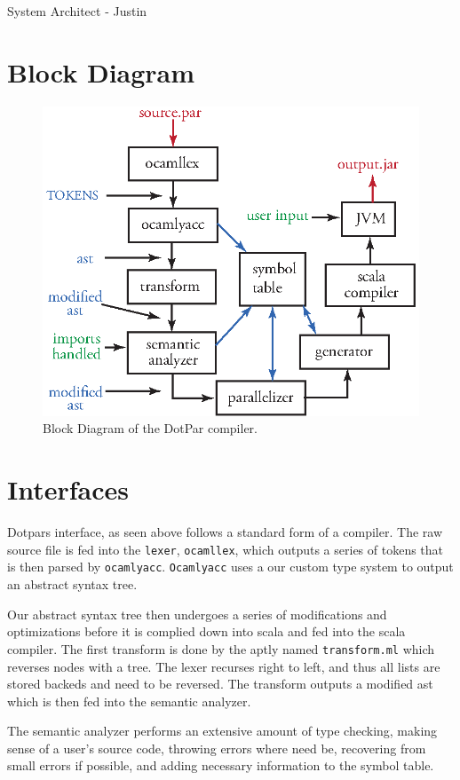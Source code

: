 System Architect - Justin
\section{Block Diagram}
\begin{figure}[H]
\centering
\includegraphics[scale=1]{blockdiagram.eps} 
\caption{Block Diagram of the DotPar compiler.}
\end{figure}

\section{Interfaces}
Dotpars interface, as seen above follows a standard form of a compiler. The raw
source file is fed into the \verb=lexer=, \verb=ocamllex=, which outputs a series of tokens that is then
parsed by \verb=ocamlyacc=.  \verb=Ocamlyacc= uses a our custom type system to output an abstract
syntax tree.

Our abstract syntax tree then undergoes a series of modifications and optimizations before it
is complied down into scala and fed into the scala compiler.  The first transform
is done by the aptly named \verb=transform.ml= which reverses nodes with a tree.  The lexer
recurses right to left, and thus all lists are stored backeds and need to be reversed.
The transform outputs a modified ast which is then fed into the semantic analyzer.

The semantic analyzer performs an extensive amount of type checking, making 
sense of a user's source code, throwing errors where need be, recovering from 
small errors if possible,  and adding necessary information to the symbol table.  

